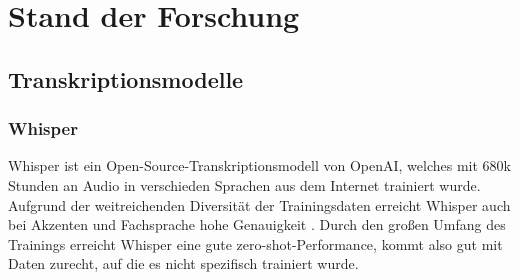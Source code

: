 \chapter{Stand der Forschung}\label{ch:relatedWork}




\section{Transkriptionsmodelle}

\subsection{Whisper}
Whisper ist ein Open-Source-Transkriptionsmodell von OpenAI, welches mit 680k Stunden an Audio in verschieden Sprachen aus dem Internet trainiert wurde.
Aufgrund der weitreichenden Diversität der Trainingsdaten erreicht Whisper auch bei Akzenten und Fachsprache  hohe Genauigkeit \citep{whisper}.
Durch den großen Umfang des Trainings erreicht Whisper eine gute zero-shot-Performance, kommt also gut mit Daten zurecht, auf die es nicht spezifisch trainiert wurde.

